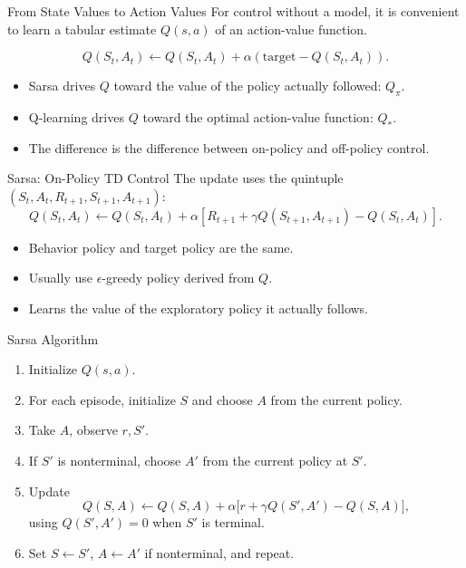 \documentclass[aspectratio=169]{beamer}
\begin{document}
\begin{frame}{From State Values to Action Values}
\small
For control without a model, it is convenient to learn a tabular estimate $Q(s,a)$ of an action-value function.

\vspace{0.5em}
\[
Q(S_t,A_t)\leftarrow Q(S_t,A_t)+\alpha(\text{target}-Q(S_t,A_t)).
\]

\vspace{0.5em}
\begin{itemize}
    \item Sarsa drives $Q$ toward the value of the policy actually followed: $Q_\pi$.
    \item Q-learning drives $Q$ toward the optimal action-value function: $Q_*$.
    \item The difference is the difference between on-policy and off-policy control.
\end{itemize}
\end{frame}

\begin{frame}{Sarsa: On-Policy TD Control}
\small
The update uses the quintuple $(S_t,A_t,R_{t+1},S_{t+1},A_{t+1})$:
\[
Q(S_t,A_t)\leftarrow Q(S_t,A_t)+\alpha
\left[
R_{t+1}+\gamma Q(S_{t+1},A_{t+1})-Q(S_t,A_t)
\right].
\]

\vspace{0.7em}
\begin{itemize}
    \item Behavior policy and target policy are the same.
    \item Usually use $\epsilon$-greedy policy derived from $Q$.
    \item Learns the value of the exploratory policy it actually follows.
\end{itemize}
\end{frame}

\begin{frame}{Sarsa Algorithm}
\small
\begin{enumerate}
    \item Initialize $Q(s,a)$.
    \item For each episode, initialize $S$ and choose $A$ from the current policy.
    \item Take $A$, observe $r,S'$.
    \item If $S'$ is nonterminal, choose $A'$ from the current policy at $S'$.
    \item Update
    \[
    Q(S,A)\leftarrow Q(S,A)+\alpha\bigl[r+\gamma Q(S',A')-Q(S,A)\bigr],
    \]
    using $Q(S',A')=0$ when $S'$ is terminal.
    \item Set $S\leftarrow S'$, $A\leftarrow A'$ if nonterminal, and repeat.
\end{enumerate}
\end{frame}
\end{document}

